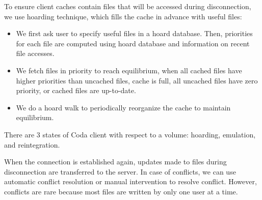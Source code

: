 \begin{multicols*}{2}
\noindent To ensure client caches contain files that will be accessed during disconnection, we use hoarding technique, which fills the cache in advance with useful files:
\begin{itemize}
    \item We first ask user to specify useful files in a hoard database. Then, priorities for each file are computed using hoard database and information on recent file accesses.
    \item We fetch files in priority to reach equilibrium, when all cached files have higher priorities than uncached files, cache is full, all uncached files have zero priority, or cached files are up-to-date. 
    \item We do a hoard walk to periodically reorganize the cache to maintain equilibrium. 
\end{itemize}

\noindent There are 3 states of Coda client with respect to a volume: hoarding, emulation, and reintegration. 

\begin{center}
\end{center}

\noindent When the connection is established again, updates made to files during disconnection are transferred to the server. In case of conflicts, we can use automatic conflict resolution or manual intervention to resolve conflict. However, conflicts are rare because most files are written by only one user at a time. 

\end{multicols*}

